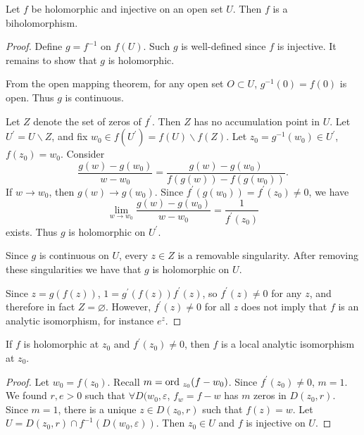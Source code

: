 \begin{theorem}
Let $f$ be holomorphic and injective on an open set $U$. Then
$f$ is a biholomorphism.
\end{theorem}

\begin{proof}
Define $g = f^{-1}$ on $f(U)$. Such $g$ is well-defined since
$f$ is injective. It remains to show that $g$ is holomorphic.

From the open mapping theorem, for any open set $O \subset U$,
$g^{-1}(0) = f(0)$ is open. Thus $g$ is continuous.

Let $Z$ denote the set of zeros of $f^\prime$. Then $Z$ has no
accumulation point in $U$. Let $U^\prime = U \backslash Z$, and
fix $w_0 \in f(U^\prime) = f(U) \backslash f(Z)$. Let
$z_0 = g^{-1}(w_0) \in U^\prime$, $f(z_0) = w_0$.
Consider
$$
  \frac{g(w) - g(w_0)}{w - w_0}
= \frac{g(w) - g(w_0)}{f(g(w)) - f(g(w_0))}.
$$
If $w \to w_0$, then $g(w) \to g(w_0)$. Since
$f^\prime(g(w_0)) = f^\prime(z_0) \neq 0$, we have
$$
  \lim_{w \to w_0}  \frac{g(w) - g(w_0)}{w - w_0}
= \frac{1}{f^\prime(z_0)}
$$
exists. Thus $g$ is holomorphic on $U^\prime$.

Since $g$ is continuous on $U$, every $z \in Z$ is
a removable singularity. After removing these singularities
we have that $g$ is holomorphic on $U$.

Since $z = g(f(z))$, $1 = g^\prime(f(z)) f^\prime(z)$, so
$f^\prime(z) \neq 0$ for any $z$, and therefore in fact
$Z = \varnothing$. However, $f^\prime(z) \neq 0$ for all $z$
does not imply that $f$ is an analytic isomorphism, for instance
$e^z$.
\end{proof}

\begin{theorem}
If $f$ is holomorphic at $z_0$ and $f^\prime(z_0) \neq 0$, then
$f$ is a local analytic isomorphism at $z_0$.
\end{theorem}

\begin{proof}
Let $w_0 = f(z_0)$. Recall $m = \mathrm{ord}~_{z_0} (f - w_0)$. Since
$f^\prime(z_0) \neq 0$, $m = 1$. We found $r, e > 0$ such that
$\forall D(w_0, \varepsilon$, $f_w = f - w$ has $m$ zeros in
$D(z_0, r)$. Since $m = 1$, there is a unique $z \in D(z_0, r)$
such that $f(z) = w$. Let
$U = D(z_0, r) \cap f^{-1}(D(w_0, \varepsilon))$.
Then $z_0 \in U$ and $f$ is injective on $U$.
\end{proof}
